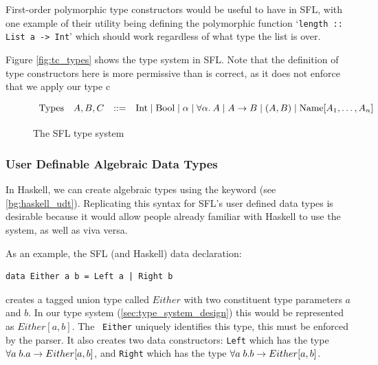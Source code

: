 First-order polymorphic type constructors would be useful to have in \ac{SFL}, with one example of their utility being defining the polymorphic function `\verb|length :: List a -> Int|' which should work regardless of what type the list is over. 

Figure \ref{fig:tc_types} shows the type system in SFL. Note that the definition of type constructors here is more permissive than is correct, as it does not enforce that we apply our type c

% 


\begin{figure}
    \[
        \begin{array}{llcl}
            \text{Types} & A, B, C & \mathrel{::=} &
                \text{Int} \mathrel{\mid} 
                \text{Bool} \mathrel{\mid} 
                \alpha \mathrel{\mid} \forall\alpha.\:{A} \mathrel{\mid} 
                A \rightarrow B \mathrel{\mid} (A, B) \mathrel{\mid} \text{Name}[A_1, \dots, A_n]
            \\[2pt]
        \end{array}
    \]
    \caption{The SFL type system}
    \label{fig:sfl_types_no_exst}
\end{figure}

\subsubsection{User Definable Algebraic Data Types}
\label{c2:design_data_types}
In Haskell, we can create algebraic types using the  keyword (see \ref{bg:haskell_udt}). Replicating this syntax for \ac{SFL}'s user defined data types is desirable because it would allow people already familiar with Haskell to use the system, as well as viva versa. 

As an example, the SFL (and Haskell) data declaration:
\begin{lstlisting}[language=SFL_unboxed_noprelude]
data Either a b = Left a | Right b
\end{lstlisting}
\noindent creates a tagged union type called $Either$ with two constituent type parameters $a$ and $b$. In our type system (\ref{sec:type_system_design}) this would be represented as $Either[a, b]$. The \Unionname 
 \ \verb|Either| uniquely identifies this type, this must be enforced by the parser. It also creates two data constructors: \verb|Left| which has the type $\forall a\;b. a \rightarrow Either[a,b]$, and \verb|Right| which has the type $\forall a\;b. b \rightarrow Either[a,b]$. 

